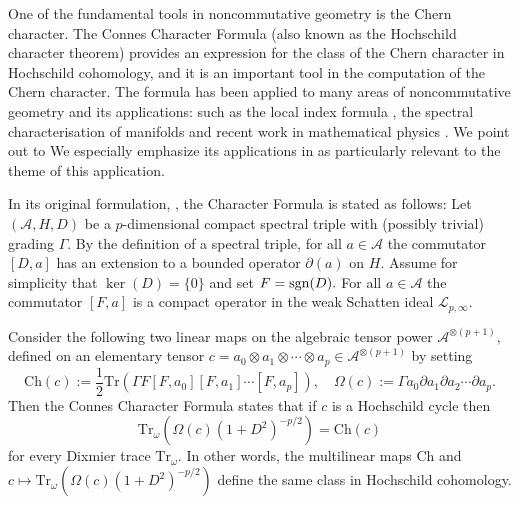 \documentclass{article}
\begin{document}
One of the fundamental tools in noncommutative geometry is the Chern character. The Connes Character Formula (also known as the Hochschild character theorem) provides an expression for the class of the Chern character in Hochschild cohomology, and it is an important    tool in the computation of the Chern character. The formula has been applied to many areas     of noncommutative geometry and its applications: such as the local index formula \cite{ConnesMoscovici}, the spectral characterisation of manifolds \cite{Connes-reconstruction} and recent work in mathematical physics \cite{Connes-Chamseddine-Mukhanov-quanta-of-geometry-2015}. {\color{red} We point out to }We especially emphasize its applications in \cite{Connes-reconstruction} as particularly relevant to the theme of this application.

In its original formulation, \cite{Connes-original-spectral-1995}, the Character Formula is stated as follows: Let $(\mathcal{A},H,D)$ be a $p$-dimensional compact spectral triple     with (possibly trivial) grading $\Gamma.$ By the definition of a spectral triple, for all $a \in \mathcal{A}$ the commutator $[D,a]$ has an extension to a bounded operator $\partial(a)$ on $H.$ Assume for simplicity that $\ker(D)=\{0\}$ and set $F={\rm sgn}(D).$ For all $a \in \mathcal{A}$ the commutator $[F,a]$ is a compact operator in the weak Schatten ideal $\mathcal{L}_{p,\infty}.$ 

Consider the following two linear maps on the algebraic tensor power $\mathcal{A}^{\otimes(p+1)},$ defined on an elementary tensor $c = a_0\otimes a_1\otimes \cdots \otimes a_p \in \mathcal{A}^{\otimes(p+1)}$ by setting
$$\mathrm{Ch}(c) := \frac{1}{2}\mathrm{Tr}(\Gamma F[F,a_0][F,a_1]\cdots[F,a_p]),\quad \Omega(c) := \Gamma a_0\partial a_1\partial a_2\cdots \partial a_p.$$
Then the Connes Character Formula states that if $c$ is a Hochschild cycle then
\begin{equation*}
\mathrm{Tr}_\omega(\Omega(c)(1+D^2)^{-p/2}) = \mathrm{Ch}(c)
\end{equation*}
for every Dixmier trace $\mathrm{Tr}_\omega$. In other words, the multilinear maps $\mathrm{Ch}$ and $c \mapsto \mathrm{Tr}_\omega(\Omega(c)(1+D^2)^{-p/2})$ define the same class in Hochschild cohomology.
    
\end{document}
